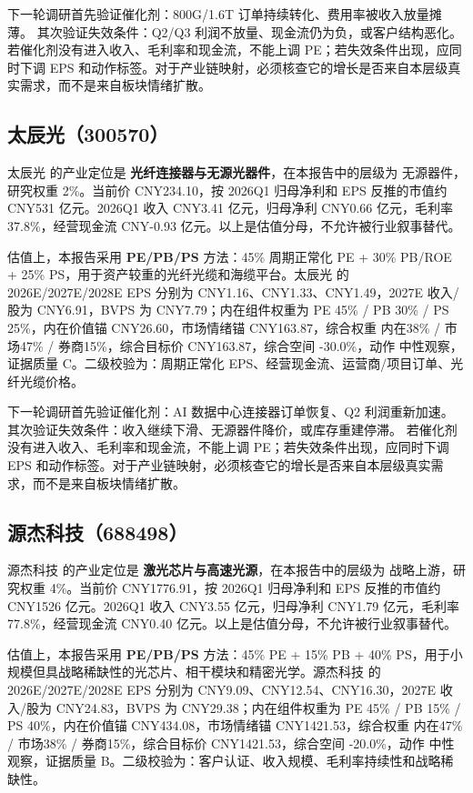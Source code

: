 下一轮调研首先验证催化剂：800G/1.6T 订单持续转化、费用率被收入放量摊薄。 其次验证失效条件：Q2/Q3 利润不放量、现金流仍为负，或客户结构恶化。 若催化剂没有进入收入、毛利率和现金流，不能上调 PE；若失效条件出现，应同时下调 EPS 和动作标签。对于产业链映射，必须核查它的增长是否来自本层级真实需求，而不是来自板块情绪扩散。


\subsection{太辰光（300570）}
太辰光 的产业定位是 \textbf{光纤连接器与无源光器件}，在本报告中的层级为 无源器件，研究权重 2\%。当前价 CNY234.10，按 2026Q1 归母净利和 EPS 反推的市值约 CNY531 亿元。2026Q1 收入 CNY3.41 亿元，归母净利 CNY0.66 亿元，毛利率 37.8\%，经营现金流 CNY-0.93 亿元。以上是估值分母，不允许被行业叙事替代。

估值上，本报告采用 \textbf{PE/PB/PS} 方法：45\% 周期正常化 PE + 30\% PB/ROE + 25\% PS，用于资产较重的光纤光缆和海缆平台。太辰光 的 2026E/2027E/2028E EPS 分别为 CNY1.16、CNY1.33、CNY1.49，2027E 收入/股为 CNY6.91，BVPS 为 CNY7.79；内在组件权重为 PE 45\% / PB 30\% / PS 25\%，内在价值锚 CNY26.60，市场情绪锚 CNY163.87，综合权重 内在38\% / 市场47\% / 券商15\%，综合目标价 CNY163.87，综合空间 -30.0\%，动作 中性观察，证据质量 C。二级校验为：周期正常化 EPS、经营现金流、运营商/项目订单、光纤光缆价格。

下一轮调研首先验证催化剂：AI 数据中心连接器订单恢复、Q2 利润重新加速。 其次验证失效条件：收入继续下滑、无源器件降价，或库存重建停滞。 若催化剂没有进入收入、毛利率和现金流，不能上调 PE；若失效条件出现，应同时下调 EPS 和动作标签。对于产业链映射，必须核查它的增长是否来自本层级真实需求，而不是来自板块情绪扩散。


\subsection{源杰科技（688498）}
源杰科技 的产业定位是 \textbf{激光芯片与高速光源}，在本报告中的层级为 战略上游，研究权重 4\%。当前价 CNY1776.91，按 2026Q1 归母净利和 EPS 反推的市值约 CNY1526 亿元。2026Q1 收入 CNY3.55 亿元，归母净利 CNY1.79 亿元，毛利率 77.8\%，经营现金流 CNY0.40 亿元。以上是估值分母，不允许被行业叙事替代。

估值上，本报告采用 \textbf{PE/PB/PS} 方法：45\% PE + 15\% PB + 40\% PS，用于小规模但具战略稀缺性的光芯片、相干模块和精密光学。源杰科技 的 2026E/2027E/2028E EPS 分别为 CNY9.09、CNY12.54、CNY16.30，2027E 收入/股为 CNY24.83，BVPS 为 CNY29.38；内在组件权重为 PE 45\% / PB 15\% / PS 40\%，内在价值锚 CNY434.08，市场情绪锚 CNY1421.53，综合权重 内在47\% / 市场38\% / 券商15\%，综合目标价 CNY1421.53，综合空间 -20.0\%，动作 中性观察，证据质量 B。二级校验为：客户认证、收入规模、毛利率持续性和战略稀缺性。

